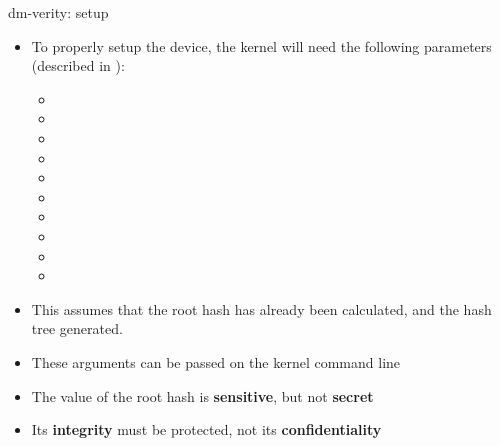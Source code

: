 \begin{frame}{dm-verity: setup}
  \begin{itemize}
    \item To properly setup the  device, the kernel will need the following parameters
          (described in ):
    \begin{itemize}
      \item {}
      \item {}
      \item {}
      \item {}
      \item {}
      \item {}
      \item {}
      \item {}
      \item {}
      \item {}
    \end{itemize}
    \item This assumes that the root hash has already been calculated, and the hash tree generated.
    \item These arguments can be passed on the kernel command line
    \item The value of the root hash is \textbf{sensitive}, but not \textbf{secret}
    \item Its \textbf{integrity} must be protected, not its \textbf{confidentiality}
  \end{itemize}
\end{frame}

